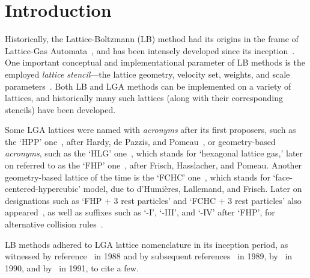 \section{Introduction}

    Historically,   the   Lattice-Boltzmann   (LB)    method    had    its    origins    in    the    frame    of    Lattice-Gas
    Automata~\cite{1988-McNamaraGR+ZanettiG-PhysRevLett},     and     has     been     intensely     developed     since     its
    inception~\cite{2018-KrugerT+ViggenEM-Springer}. One important conceptual and implementational parameter of  LB  methods  is
    the    employed    \emph{lattice    stencil}---the    lattice    geometry,    velocity    set,    weights,     and     scale
    parameters~\cite{2013-HegeleJr+PhilippiPC-JSciComput,                                2013-MattilaKK+PhilippiPC-IntJModPhysC,
    2014-MattilaKK+PhilippiPC-SciWorldJ}. Both LB and LGA methods can be implemented on a variety of lattices, and  historically
    many such lattices (along with their corresponding stencils) have been developed.

    Some   LGA   lattices   were   named   with   \emph{acronyms}   after   its   first   proposers,   such   as    the    `HPP'
    one~\cite{1986-FrischU+PomeauY-PhysRevLett},  after  Hardy,  de  Pazzis,   and   Pomeau~\cite{1973-HardyJ+PazzisO-JMathPhys,
    1976-HardyJ+PomeauY-PhysRevA,  1987-SucciS-JPhysAMathGen},  or   geometry-based   \emph{acronyms},   such   as   the   `HLG'
    one~\cite{1986-FrischU+PomeauY-PhysRevLett}, which stands for `hexagonal lattice gas,' later on referred  to  as  the  `FHP'
    one~\cite{1987-FrischU+RivetJP-ComplexSyst,  1987-SucciS-JPhysAMathGen},  after  Frisch,  Hasslacher,  and  Pomeau.  Another
    geometry-based  lattice  of  the  time  is  the  `FCHC'  one~\cite{1987-FrischU+RivetJP-ComplexSyst},   which   stands   for
    `face-centered-hypercubic' model, due to d'Humières, Lallemand, and Frisch. Later on designations such  as  `FHP  +  3  rest
    particles' and `FCHC + 3 rest particles' also appeared~\cite{1991-BoonJP-PhysD}, as well as suffixes such as  `-I',  `-III',
    and   `-IV'   after   `FHP',   for   alternative   collision   rules~\cite{1991-AppertC+ZaleskiS-PhysD,   1991-BoonJP-PhysD,
    1991-ChenS+RoseH-PhysD}.

    LB   methods   adhered    to    LGA    lattice    nomenclature    in    its    inception    period,    as    witnessed    by
    reference~\cite{1988-McNamaraGR+ZanettiG-PhysRevLett}          in          1988          and          by          subsequent
    references~\cite{1989-HigueraFJ+JimenezJ-EurophysLett,         1989-HigueraFJ+SucciS-EurophysLett}         in          1989,
    by~\cite{1990-BenziR+VergassolaM-EurophysLett,   1990-BenziR+VergassolaM-NuclPhysB,    1990-CancelliereA+SucciS-PhysFluidsA,
    1990-VergassolaM+SucciS-EurophysLett}   in   1990,   and   by~\cite{1991-CornubertR+LevermoreD-PhysD,    1991-ErnstMH-PhysD,
    1991-FrischU-PhysD, 1991-GunstensenAK+ZanettiG-PhysRevA, 1991-SucciS+BenziR-PhysRevA} in 1991, to cite a few.

